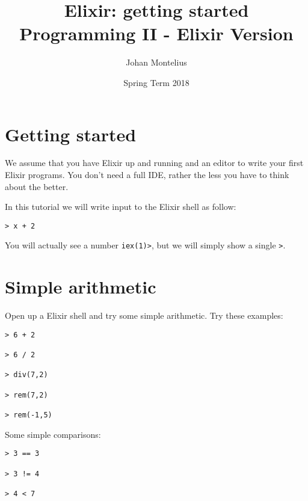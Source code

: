 \documentclass[a4paper,11pt]{article}
\begin{document}

\title{
    \textbf{Elixir: getting started}\\
    \large{Programming II - Elixir Version}
}
\author{Johan Montelius}
\date{Spring Term 2018}
\maketitle
\thispagestyle{fancy}



\section*{Getting started}

We assume that you have Elixir up and running and an editor to write
your first Elixir programs. You don't need a full IDE, rather the
less you have to think about the better.


In this tutorial we will write input to the Elixir shell as follow:

\begin{verbatim}
> x + 2
\end{verbatim}

You will actually see a number {\tt iex(1)>}, but we will simply
show a single {\tt >}.  



\section{Simple arithmetic}

Open up a Elixir shell and try some simple arithmetic. Try these examples:

\begin{verbatim}
> 6 + 2

> 6 / 2

> div(7,2)

> rem(7,2)

> rem(-1,5)
\end{verbatim}

Some simple comparisons:

\begin{verbatim}
> 3 == 3

> 3 != 4

> 4 < 7
\end{verbatim}
\end{document}
